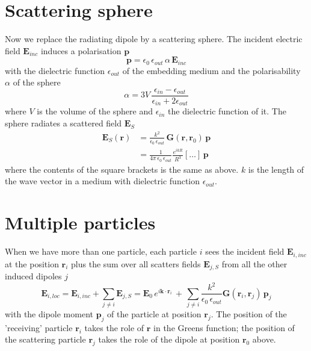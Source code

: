 \section{Scattering sphere}

Now we replace the radiating dipole by a scattering sphere. The incident electric field $\mathbf{E}_{inc}$ induces a polarisation $\mathbf{p}$ 
\begin{equation}
\mathbf{p} = \epsilon_0 \, \epsilon_{out} \, \alpha \, \mathbf{E}_{inc}
\end{equation}
with the dielectric function $\epsilon_{out}$ of the embedding medium and the polarisability $\alpha$ of the sphere
\begin{equation}
 \alpha = 3V \, \frac{\epsilon_{in} - \epsilon_{out}}{\epsilon_{in} + 2 \epsilon_{out}}
\end{equation}
where $V$ is the volume of the sphere and  $\epsilon_{in}$ the dielectric function of it. The sphere  radiates a scattered field $\mathbf{E}_S$
\begin{align}
\mathbf{E}_S(\mathbf{r}) & =  \frac{k^2}{\epsilon_0 \, \epsilon_{out}} \, \mathbf{G}(\mathbf{r}, \mathbf{r}_0) \,  \mathbf{p} \\
 & =  \frac{1}{4 \pi \, \epsilon_0 \, \epsilon_{out}  }  \frac{e^{i k R} }{  R^3 } 
\left[  \dots \right] \, \mathbf{p}
\end{align}
where the contents of the square brackets is the same as above. $k$ is the length of the wave vector in a medium with dielectric function $\epsilon_{out}$.

\section{Multiple particles}

When we have more than one particle, each particle $i$ sees the incident field $\mathbf{E}_{i, inc}$ at the   position $\mathbf{r}_i$ plus the sum over all scatters fields $\mathbf{E}_{j, S}$ from all the other induced dipoles $j$
\begin{equation}
\mathbf{E}_{i, loc} = \mathbf{E}_{i, inc} + \sum_{j \neq i} \mathbf{E}_{j, S}
 = \mathbf{E}_{0} \, e^{i \mathbf{k} \cdot \mathbf{r}_i} \, +  \, 
 \sum_{j \neq i} \frac{k^2}{\epsilon_0 \, \epsilon_{out}} 
 \mathbf{G}(\mathbf{r}_i, \mathbf{r}_j) \,  \mathbf{p}_j  \label{eq:dda_elocal}
\end{equation}
with the dipole moment $ \mathbf{p}_j$ of the particle at position $\mathbf{r}_j$. The position of the 'receiving' particle $\mathbf{r}_i$ takes the role of $\mathbf{r}$ in the Greens function; the position of the scattering particle $\mathbf{r}_j$ takes the role of the dipole at position $\mathbf{r}_0$ above.

